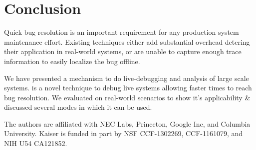 \section{Conclusion}
\label{sec:conclusion}

\noindent
Quick bug resolution is an important requirement for any production system maintenance effort.
Existing techniques either add substantial overhead detering their application in real-world systems, or are unable to capture enough trace information to easily localize the bug offline. 

\noindent
We have presented \parikshan a mechanism to do live-debugging and analysis of large scale systems.
\parikshan is a novel technique to debug live systems allowing faster times to reach bug resolution.
We evaluated \parikshan on real-world scenarios to show it's applicability \& discussed several modes in which it can be used.

The authors are affiliated with NEC Labs, Princeton, Google Inc, and Columbia University. 
Kaiser is funded in part by NSF CCF-1302269, CCF-1161079, and NIH U54 CA121852.
